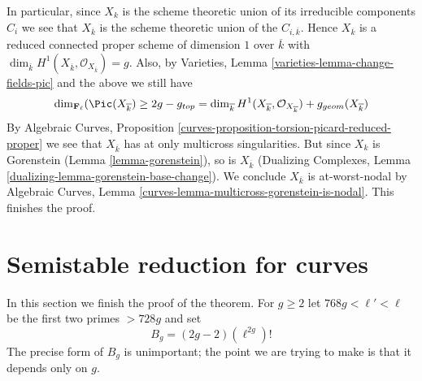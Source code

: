 \medskip\noindent
In particular, since $X_k$ is the scheme theoretic union of its
irreducible components $C_i$ we see that $X_{\overline{k}}$ is the
scheme theoretic union of the $C_{i, \overline{k}}$.
Hence $X_{\overline{k}}$ is a reduced connected proper
scheme of dimension $1$ over $\overline{k}$ with $\dim_{\overline{k}}
H^1(X_{\overline{k}}, \mathcal{O}_{X_{\overline{k}}}) = g$.
Also, by Varieties, Lemma \ref{varieties-lemma-change-fields-pic}
and the above we still have
$$
\dim_{\mathbf{F}_\ell}(\Pic(X_{\overline{k}})
\geq 2g - g_{top} =
\dim_{\overline{k}} H^1(X_{\overline{k}}, \mathcal{O}_{X_{\overline{k}}})
+ g_{geom}(X_{\overline{k}})
$$
By Algebraic Curves, Proposition
\ref{curves-proposition-torsion-picard-reduced-proper}
we see that $X_{\overline{k}}$ has at only multicross singularities.
But since $X_k$ is Gorenstein (Lemma \ref{lemma-gorenstein}),
so is $X_{\overline{k}}$ (Dualizing Complexes, Lemma
\ref{dualizing-lemma-gorenstein-base-change}).
We conclude $X_{\overline{k}}$ is at-worst-nodal by
Algebraic Curves, Lemma \ref{curves-lemma-multicross-gorenstein-is-nodal}.
This finishes the proof.










\section{Semistable reduction for curves}
\label{section-semistable-reduction-theorem}

\noindent
In this section we finish the proof of the theorem.
For $g \geq 2$ let $768g < \ell' < \ell$
be the first two primes $> 728g$ and set
\begin{equation}
\label{equation-bound}
B_g = (2g - 2)(\ell^{2g})!
\end{equation}
The precise form of $B_g$ is unimportant; the point we are trying
to make is that it depends only on $g$.

